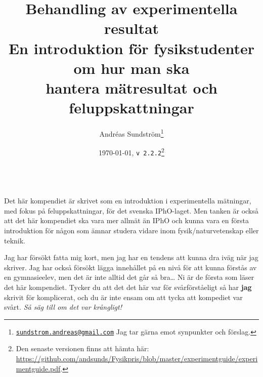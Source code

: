 \documentclass[11pt,a4paper, swedish
]{article}
\begin{document}
\title{\huge Behandling av experimentella resultat\\[2mm] 
\Large En introduktion för fysikstudenter om hur man ska\\ hantera
mätresultat och feluppskattningar}
\author{
Andréas Sundström\footnote{
\href{mailto:sundstrom.andreas@gmail.com}{\nolinkurl{sundstrom.andreas@gmail.com}}
\: Jag tar gärna emot synpunkter och förslag.}
}
\date{\today, \quad\texttt{v\,2.2.2}\footnote{Den senaste versionen finns att hämta här: \url{https://github.com/andsunds/Fysikpris/blob/master/experimentguide/experimentguide.pdf}.}}
\maketitle





\\[1mm]
\small
Det här kompendiet är skrivet som en introduktion i experimentella
mätningar, med fokus på feluppskattningar, för det svenska
IPhO-laget. Men tanken är också att det här kompendiet ska vara mer
allmät än IPhO och kunna vara en första introduktion för någon som
ämnar studera vidare inom fysik/naturvetenskap eller teknik. 

Jag har försökt fatta mig kort, men jag har en tendens att
kunna dra iväg när jag skriver. Jag har också försökt lägga innehållet
på en nivå för att kunna förstås av en gymnasieelev, men det är inte
alltid det går så bra\ldots{} Ni är de första som läser det här
kompendiet. Tycker du att det det här var för svårförståeligt så har
\textbf{jag} skrivit för komplicerat, och du är inte ensam om att
tycka att kompediet var svårt. \emph{Så säg till om det var krångligt!} 
\end{document}
